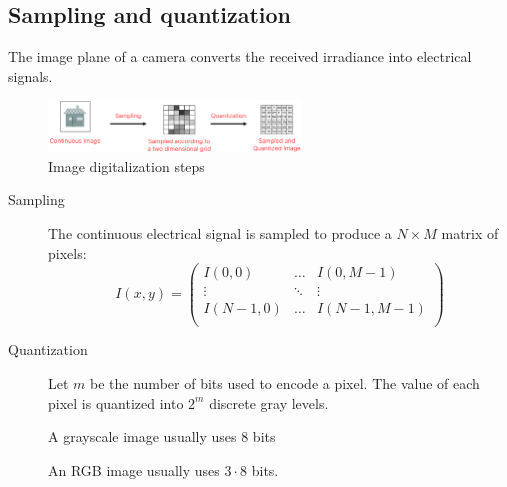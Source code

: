 \subsection{Sampling and quantization}

The image plane of a camera converts the received irradiance into electrical signals.

\begin{figure}[h]
    \centering
    \includegraphics[width=0.6\textwidth]{./img/_digitalization.pdf}
    \caption{Image digitalization steps}
\end{figure}

\begin{description}
    \item[Sampling]  
        The continuous electrical signal is sampled to produce a $N \times M$ matrix of pixels:
        \[ 
            I(x, y) = \begin{pmatrix}
                I(0, 0) & \hdots & I(0, M-1) \\
                \vdots & \ddots & \vdots \\
                I(N-1, 0) & \hdots & I(N-1, M-1) \\
            \end{pmatrix}    
        \]

    \item[Quantization] 
        Let $m$ be the number of bits used to encode a pixel.
        The value of each pixel is quantized into $2^m$ discrete gray levels.
        
        \begin{remark}
            A grayscale image usually uses $8$ bits

            An RGB image usually uses $3 \cdot 8$ bits.
        \end{remark}
\end{description}


